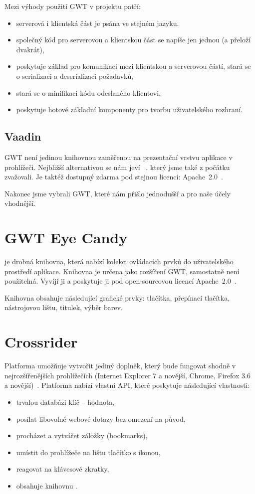 Mezi výhody použití GWT v projektu patří:
\begin{itemize}
    \item serverová i klientská část je psána ve stejném jazyku.
    \item společný kód pro serverovou a klientskou část se napíše jen jednou (a přeloží dvakrát),
    \item poskytuje základ pro komunikaci mezi klientskou a serverovou částí, stará se o serializaci a deserializaci požadavků,
    \item stará se o minifikaci kódu odeslaného klientovi,
    \item poskytuje hotové základní komponenty pro tvorbu uživatelského rozhraní.
\end{itemize}

\subsection{Vaadin}
GWT není jedinou knihovnou zaměřenou na prezentační vrstvu aplikace v prohlížeči.
Nejbližší alternativou se nám jeví ~\cite{Vaadin}, který jsme také z počátku zvažovali.
Je taktéž dostupný zdarma pod stejnou licencí: Apache~2.0~\cite{apache20}.

Nakonec jsme vybrali GWT, které nám přišlo jednodušší a pro naše účely vhodnější.

\section{GWT Eye Candy}
 je drobná knihovna, která nabízí kolekci ovládacích prvků do uživatelského prostředí aplikace.
Knihovna je určena jako rozšíření GWT, samostatně není použitelná.
Vyvíjí ji  a poskytuje ji pod open-sourcovou licencí Apache~2.0~\cite{apache20}.

Knihovna obsahuje následující grafické prvky: tlačítka, přepínací tlačítka, nástrojovou lištu, titulek, výběr barev.

\section{Crossrider}
Platforma  umožňuje vytvořit jediný doplněk, který bude fungovat shodně v nejrozšířenějších prohlížečích (Internet Explorer 7 a novější, Chrome, Firefox 3.6 a novější)~\cite{crossrider-faq}.
Platforma nabízí vlastní API, které poskytuje následující vlastnosti:
\begin{itemize}
	\item trvalou databázi klíč -- hodnota,
	\item posílat libovolné webové dotazy bez omezení na původ,
	\item procházet a vytvářet záložky (bookmarks),
	\item umístit do prohlížeče na lištu tlačítko s ikonou,
	\item reagovat na klávesové zkratky,
	\item obsahuje knihovnu .
\end{itemize}

